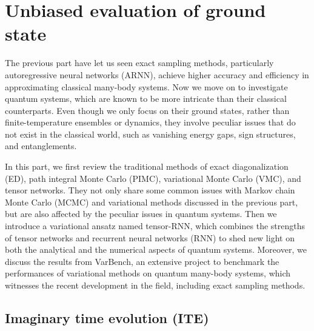 \chapter{Unbiased evaluation of ground state}

The previous part have let us seen exact sampling methods, particularly autoregressive neural networks (ARNN), achieve higher accuracy and efficiency in approximating classical many-body systems. Now we move on to investigate quantum systems, which are known to be more intricate than their classical counterparts. Even though we only focus on their ground states, rather than finite-temperature ensembles or dynamics, they involve peculiar issues that do not exist in the classical world, such as vanishing energy gaps, sign structures, and entanglements.

In this part, we first review the traditional methods of exact diagonalization (ED), path integral Monte Carlo (PIMC), variational Monte Carlo (VMC), and tensor networks. They not only share some common issues with Markov chain Monte Carlo (MCMC) and variational methods discussed in the previous part, but are also affected by the peculiar issues in quantum systems. Then we introduce a variational ansatz named tensor-RNN, which combines the strengths of tensor networks and recurrent neural networks (RNN) to shed new light on both the analytical and the numerical aspects of quantum systems. Moreover, we discuss the results from VarBench, an extensive project to benchmark the performances of variational methods on quantum many-body systems, which witnesses the recent development in the field, including exact sampling methods.

\section{Imaginary time evolution (ITE)}
\label{sec:ite}


